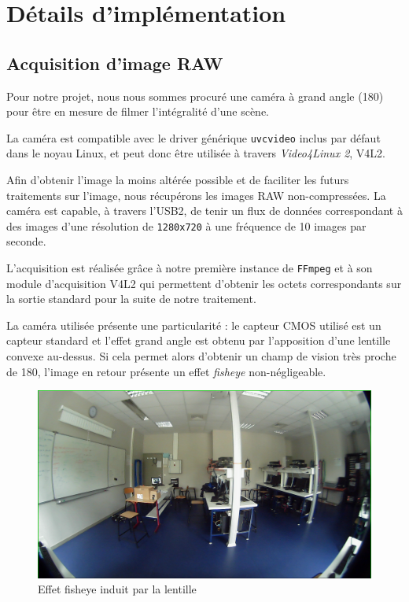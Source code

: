 \documentclass[11pt,a4paper]{article}
\begin{document}
\section{Détails d'implémentation}

\subsection{Acquisition d'image RAW}
Pour notre projet, nous nous sommes procuré une caméra à grand angle (180\degree) pour être en mesure de filmer l'intégralité d'une scène.

\bigbreak
La caméra est compatible avec le driver générique \texttt{uvcvideo} inclus par défaut dans le noyau Linux, et peut donc être utilisée à travers \textit{Video4Linux 2}, V4L2.

\bigbreak
Afin d'obtenir l'image la moins altérée possible et de faciliter les futurs traitements sur l'image, nous récupérons les images RAW non-compressées.
La caméra est capable, à travers l'USB2, de tenir un flux de données correspondant à des images d'une résolution de \texttt{1280x720} à une fréquence de 10 images par seconde.

\bigbreak
L'acquisition est réalisée grâce à notre première instance de \texttt{FFmpeg} et à son module d'acquisition V4L2 qui permettent d'obtenir les octets correspondants sur la sortie standard pour la suite de notre traitement.

\bigbreak
La caméra utilisée présente une particularité : le capteur CMOS utilisé est un capteur standard et l'effet grand angle est obtenu par l'apposition d'une lentille convexe au-dessus.
Si cela permet alors d'obtenir un champ de vision très proche de 180\degree, l'image en retour présente un effet \textit{fisheye} non-négligeable.

\bigbreak
\begin{figure}[H]
\begin{center}
\includegraphics[scale=0.2]{images/fisheye.png}
\end{center}
\caption{Effet fisheye induit par la lentille}
\label{}
\end{figure}
\bigbreak
\end{document}
